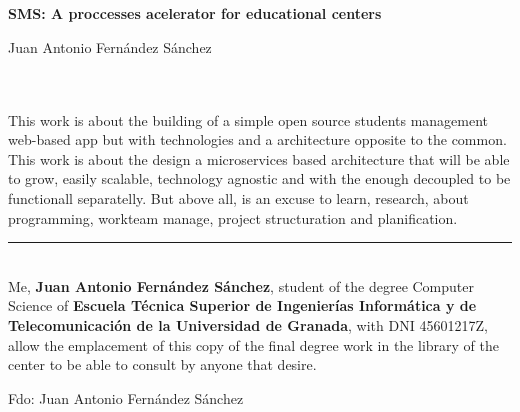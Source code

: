 \chapter*{}





\cleardoublepage
\thispagestyle{empty}

\begin{center}
{\large\bfseries SMS: A proccesses acelerator for educational centers}\\
\end{center}
\begin{center}
Juan Antonio Fernández Sánchez\\
\end{center}

\\

\vspace{0.7cm}
\\

This work is about the building of a simple  open source students management
web-based app but with technologies and a architecture opposite to the common.
This work is about the design a microservices based architecture that will be
able to grow, easily scalable, technology agnostic and with the enough decoupled
to be functionall separatelly. But above all, is an excuse to learn, research,
about programming, workteam manage, project structuration and planification.
\cleardoublepage

\thispagestyle{empty}

\noindent\rule[-1ex]{\textwidth}{2pt}\\[4.5ex]

Me, \textbf{Juan Antonio Fernández Sánchez}, student of the degree Computer
Science of \textbf{Escuela Técnica Superior de Ingenierías Informática y de
Telecomunicación de la Universidad de Granada}, with DNI 45601217Z, allow the
emplacement of this copy of the final degree work in the library of the center
to be able to consult by anyone that desire.

\vspace{6cm}

\noindent Fdo: Juan Antonio Fernández Sánchez

\vspace{2cm}

